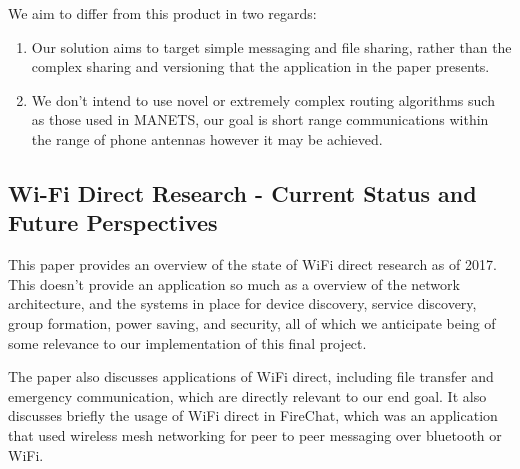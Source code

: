 \documentclass[10pt]{article}
\begin{document}
We aim to differ from this product in two regards:
\begin{enumerate}
    \item Our solution aims to target simple messaging and file sharing, rather than the complex sharing and versioning that the application in the paper presents.
    \item We don't intend to use novel or extremely complex routing algorithms such as those used in MANETS, our goal is short range communications within the range of phone antennas however it may be achieved.
\end{enumerate}

\subsection{Wi-Fi Direct Research - Current Status and Future Perspectives}
This paper  \cite{WifiDirect} provides an overview of the state of WiFi direct research as of 2017. This doesn't provide an application so
much as a overview of the network architecture, and the systems in place for device discovery, service discovery, group formation,
power saving, and security, all of which we anticipate being of some relevance to our implementation of this final project.

The paper also discusses applications of WiFi direct, including file transfer and emergency communication, which are directly relevant
to our end goal. It also discusses briefly the usage of WiFi direct in FireChat, which was an application that
used wireless mesh networking for peer to peer messaging over bluetooth or WiFi.

\end{document}
